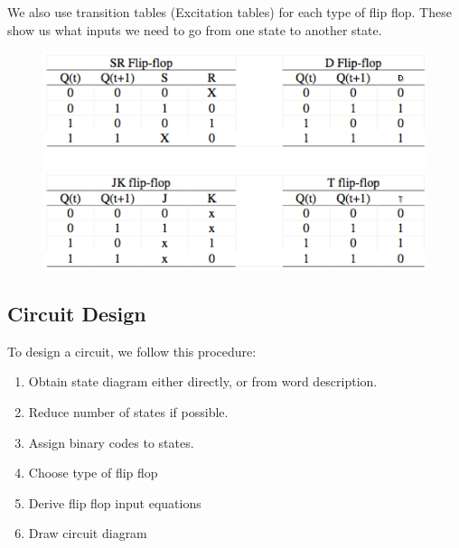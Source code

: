 \documentclass[12pt,letterpaper]{article} \usepackage{amsmath} \usepackage{graphicx}  \usepackage{longtable}  \usepackage{amssymb}
\begin{document}
        We also use transition tables (Excitation tables) for each type of flip flop. These show us what inputs we need to go from one state to another state. 
        \begin{figure}[H]
            \centering
            \includegraphics[width=0.55\linewidth]{excitation.png}
        \end{figure}

        \subsection{Circuit Design}
        To design a circuit, we follow this procedure:
        \begin{enumerate}
            \item Obtain state diagram either directly, or from word description. 
            \item Reduce number of states if possible. 
            \item Assign binary codes to states.
            \item Choose type of flip flop
            \item Derive flip flop input equations
            \item Draw circuit diagram
        \end{enumerate}
\end{document}
